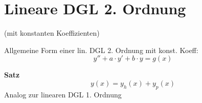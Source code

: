 \section{Lineare DGL 2. Ordnung}
(mit konstanten Koeffizienten)

Allgemeine Form einer lin. DGL 2. Ordnung mit konst. Koeff:
\begin{equation*}
    y'' + a \cdot y' + b\cdot y = g(x)
\end{equation*}

\textbf{Satz}
\begin{equation*}
    y(x) = y_h(x) + y_p(x)
\end{equation*}
Analog zur linearen DGL 1. Ordnung
